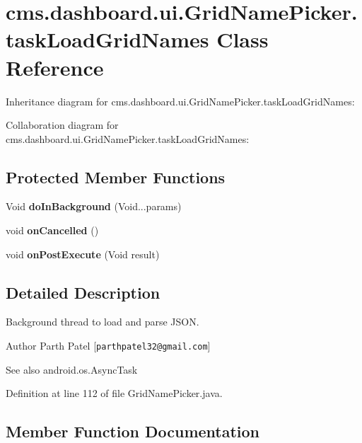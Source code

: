 \section{cms.\-dashboard.\-ui.\-Grid\-Name\-Picker.\-task\-Load\-Grid\-Names \-Class \-Reference}
\label{classcms_1_1dashboard_1_1ui_1_1_grid_name_picker_1_1task_load_grid_names}


\-Inheritance diagram for cms.\-dashboard.\-ui.\-Grid\-Name\-Picker.\-task\-Load\-Grid\-Names\-:


\-Collaboration diagram for cms.\-dashboard.\-ui.\-Grid\-Name\-Picker.\-task\-Load\-Grid\-Names\-:
\subsection*{\-Protected \-Member \-Functions}
\begin{DoxyCompactItemize}
\item 
\-Void {\bf do\-In\-Background} (\-Void...\-params)
\item 
void {\bf on\-Cancelled} ()
\item 
void {\bf on\-Post\-Execute} (\-Void result)
\end{DoxyCompactItemize}


\subsection{\-Detailed \-Description}
\-Background thread to load and parse \-J\-S\-O\-N. \par
\par


\begin{DoxyAuthor}{\-Author}
\-Parth \-Patel [{\tt parthpatel32@gmail.\-com}] 
\end{DoxyAuthor}
\begin{DoxySeeAlso}{\-See also}
android.\-os.\-Async\-Task 
\end{DoxySeeAlso}


\-Definition at line 112 of file \-Grid\-Name\-Picker.\-java.



\subsection{\-Member \-Function \-Documentation}
